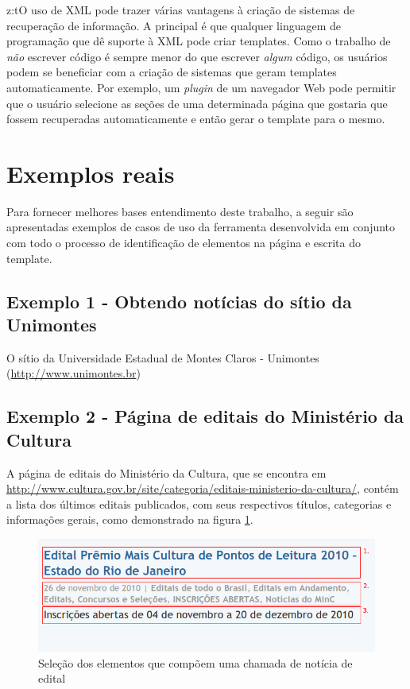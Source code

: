 z:tO uso de XML pode trazer várias vantagens à criação de sistemas de recuperação de informação. A principal é que qualquer linguagem de programação que dê suporte à XML pode criar templates. Como o trabalho de \emph{não} escrever código é sempre menor do que escrever \emph{algum} código, os usuários podem se beneficiar com a criação de sistemas que geram templates automaticamente. Por exemplo, um \emph{plugin} de um navegador Web pode permitir que o usuário selecione as seções de uma determinada página que gostaria que fossem recuperadas automaticamente e então gerar o template para o mesmo.

\pagebreak
\section{Exemplos reais}

Para fornecer melhores bases entendimento deste trabalho, a seguir são apresentadas exemplos de casos de uso da ferramenta desenvolvida em conjunto com todo o processo de identificação de elementos na página e escrita do template.

\subsection{Exemplo 1 - Obtendo notícias do sítio da Unimontes}

O sítio da Universidade Estadual de Montes Claros - Unimontes (\url{http://www.unimontes.br})

\subsection{Exemplo 2 - Página de editais do Ministério da Cultura}

A página de editais do Ministério da Cultura, que se encontra em \url{http://www.cultura.gov.br/site/categoria/editais-ministerio-da-cultura/}, contém a lista dos últimos editais publicados, com seus respectivos títulos, categorias e informações gerais, como demonstrado na figura \ref{minc}.

\begin{figure} [ht]
	\centering
	\includegraphics[scale=0.8]{minc.png}
	\caption{Seleção dos elementos que compõem uma chamada de notícia de edital}
	\label{minc}
\end{figure}

